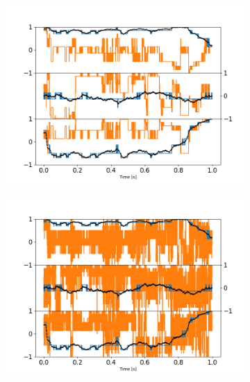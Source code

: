 \begin{figure}[h!]
	\centering
	\begin{subfigure}{0.32\textwidth}
		\subcaption{}
		\includegraphics[width=\textwidth]{fig10a.png}
	\end{subfigure}
	\begin{subfigure}{0.32\textwidth}
		\subcaption{}
		\includegraphics[width=\textwidth]{fig10b.png}
	\end{subfigure}
	\begin{subfigure}{0.32\textwidth}
		\subcaption{}

\end{subfigure}
\end{figure}
